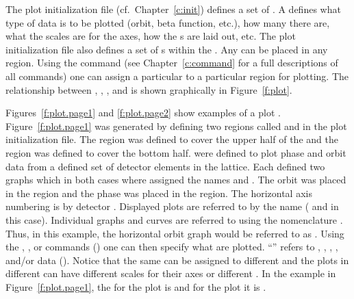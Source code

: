 The plot initialization file (cf.~Chapter~\ref{c:init}) defines a set of . A  defines what type of data is to be plotted (orbit, beta function,
etc.), how many  there are, what the scales are for the  axes, how
the s are laid out, etc.  The plot initialization file also defines a set of
s within the . Any  can be placed in any
region. Using the  command (see Chapter~\ref{c:command} for a full descriptions
of all commands) one can assign a particular  to a particular region for
plotting.  The relationship between , , , and  is
shown graphically in Figure~\ref{f:plot}.

Figures~\ref{f:plot.page1} and \ref{f:plot.page2} show examples of a plot
. Figure~\ref{f:plot.page1} was generated by defining two regions called 
and  in the plot initialization file. The  region was defined to cover
the upper half of the  and the  region was defined to cover the bottom
half.  were defined to plot phase and orbit data from a defined set of
detector elements in the lattice. Each  defined two graphs which in both
cases where assigned the names  and . The orbit  was placed
in the  region and the phase  was placed in the 
region. The horizontal axis numbering is by detector .  Displayed plots are
referred to by the  name ( and  in this case). Individual
graphs and curves are referred to using the nomenclature . Thus, in
this example, the horizontal orbit graph would be referred to as .  Using the
, , or  commands () one can then
specify what  are plotted. ``'' refers to ,
, , , and/or  data ().
Notice that the same  can be assigned to different  and the
plots in different  can have different scales for their axes or different
. In the example in Figure~\ref{f:plot.page1}, the  for the
 plot is  and for the  plot it is .

